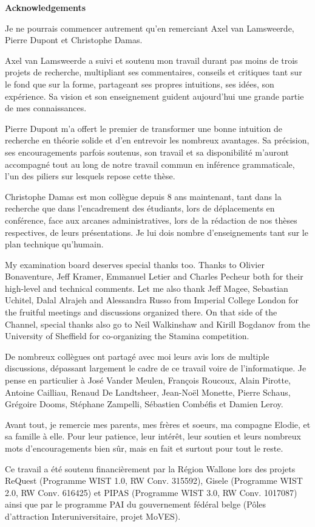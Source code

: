 \begin{center}
\textbf{\large Acknowledgements}
\end{center}

Je ne pourrais commencer autrement qu'en remerciant Axel van Lamsweerde, Pierre 
Dupont et Christophe Damas.

Axel van Lamsweerde a suivi et soutenu mon travail durant pas moins de trois 
projets de recherche, multipliant ses commentaires, conseils et critiques tant 
sur le fond que sur la forme, partageant ses propres intuitions, ses id\'ees,
son exp\'erience. Sa vision et son enseignement guident aujourd'hui une 
grande partie de mes connaissances.

Pierre Dupont m'a offert le premier de transformer une bonne intuition de 
recherche en th\'eorie solide et d'en entrevoir les nombreux avantages. Sa 
pr\'ecision, ses encouragements parfois soutenus, son travail et sa 
disponibilit\'e m'auront accompagn\'e tout au long de notre travail commun en 
inf\'erence grammaticale, l'un des piliers sur lesquels repose cette th\`ese.

Christophe Damas est mon coll\`egue depuis 8 ans maintenant, tant dans la 
recherche que dans l'encadrement des \'etudiants, lors de d\'eplacements en 
conf\'erence, face aux arcanes administratives, lors de la r\'edaction de nos 
th\`eses respectives, de leurs pr\'esen\-tations. Je lui dois nombre 
d'enseignements tant sur le plan technique qu'humain.

My examination board deserves special thanks too. Thanks to Olivier Bonaventure, 
Jeff Kramer, Emmanuel Letier and Charles Pecheur both for their high-level and 
technical comments. Let me also thank Jeff Magee, Sebastian Uchitel, Dalal 
Alrajeh and Alessandra Russo from Imperial College London for the fruitful 
meetings and discussions organized there. On that side of the Channel, special 
thanks also go to Neil Walkinshaw and Kirill Bogdanov from the University of 
Sheffield for co-organizing the Stamina competition.

De nombreux coll\`egues ont partag\'e avec moi leurs avis lors de multiple
discussions, d\'epassant largement le cadre de ce travail voire de l'informatique. 
Je pense en particulier \`a Jos\'e Vander Meulen, Fran\c{c}ois Roucoux, Alain 
Pirotte, Antoine Cailliau, Renaud De Landtsheer, Jean-No\"el Monette, Pierre 
Schaus, Gr\'egoire Dooms, St\'ephane Zampelli, S\'ebastien Comb\'efis et Damien 
Leroy.

Avant tout, je remercie mes parents, mes fr\`eres et soeurs, ma compagne Elodie, 
et sa famille \`a elle. Pour leur patience, leur int\'er\^et, leur soutien et 
leurs nombreux mots d'encouragements bien s\^ur, mais en fait et surtout pour 
tout le reste.

Ce travail a \'et\'e soutenu financi\`erement par la R\'egion Wallone lors des 
projets ReQuest (Programme WIST 1.0, RW Conv. 315592), Gisele (Programme WIST 2.0, 
RW Conv. 616425) et PIPAS (Programme WIST 3.0, RW Conv. 1017087) ainsi que par 
le programme PAI du gouvernement f\'ed\'eral belge (P\^oles d'attraction 
Interuniversitaire, projet MoVES).
